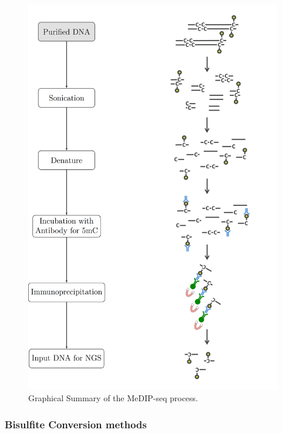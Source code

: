 \documentclass[]{book}
\begin{document}
\begin{figure}

{\centering \includegraphics[width=1\linewidth]{figs/MeDIPseqReaction} 

}

\caption{Graphical Summary of the MeDIP-seq process.}\label{fig:MeDIPseqReaction}
\end{figure}



\hypertarget{bisulfite-conversion-methods}{%
\subsubsection{Bisulfite Conversion methods}\label{bisulfite-conversion-methods}}
\end{document}
